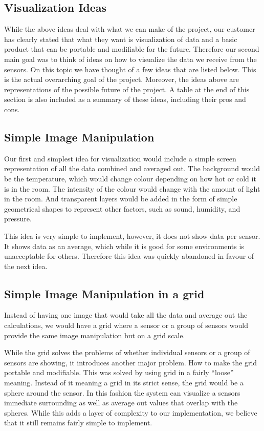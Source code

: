 \documentclass[../document.tex]{subfiles}
\begin{document}
\subsection*{Visualization Ideas}
While the above ideas deal with what we can make of the project, our customer has clearly stated that what they want is visualization of data and a basic product that can be portable and modifiable for the future. Therefore our second main goal was to think of ideas on how to visualize the data we receive from the sensors. On this topic we have thought of a few ideas that are listed below. This is the actual overarching goal of the project. Moreover, the ideas above are representations of the possible future of the project. A table at the end of this section is also included as a summary of these ideas, including their pros and cons.

\subsection*{Simple Image Manipulation}
Our first and simplest idea for visualization would include a simple screen representation of all the data combined and averaged out. The background would be the temperature, which would change colour depending on how hot or cold it is in the room. The intensity of the colour would change with the amount of light in the room. And transparent layers would be added in the form of simple geometrical shapes to represent other factors, such as sound, humidity, and pressure.

This idea is very simple to implement, however, it does not show data per sensor. It shows data as an average, which while it is good for some environments is unacceptable for others. Therefore this idea was quickly abandoned in favour of the next idea.

\subsection*{Simple Image Manipulation in a grid}
Instead of having one image that would take all the data and average out the calculations, we would have a grid where a sensor or a group of sensors would provide the same image manipulation but on a grid scale.

While the grid solves the problems of whether individual sensors or a group of sensors are showing, it introduces another major problem. How to make the grid portable and modifiable. This was solved by using grid in a fairly ``loose'' meaning. Instead of it meaning a grid in its strict sense, the grid would be a sphere around the sensor. In this fashion the system can visualize a sensors immediate surrounding as well as average out values that overlap with the spheres. While this adds a layer of complexity to our implementation, we believe that it still remains fairly simple to implement.
\end{document}
